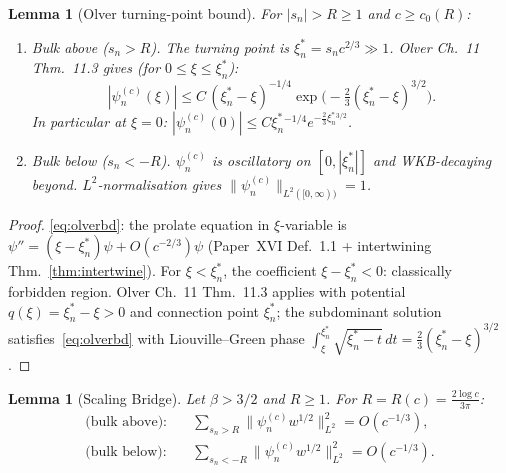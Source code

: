 \documentclass[12pt,a4paper]{amsart}
\newtheorem{lemma}[theorem]{Lemma}
\theoremstyle{definition}
\newcommand{\xin}{\xi_n^*}
\begin{document}
\begin{lemma}[Olver turning-point bound]
\label{lem:efbound}
For $|s_n|>R\geq 1$ and $c\geq c_0(R)$:
\begin{enumerate}[nosep,label=(\roman*)]
  \item \emph{Bulk above} ($s_n>R$).
    The turning point is $\xin = s_n c^{2/3}\gg 1$.
    Olver \cite{Olver1997} Ch.~11 Thm.~11.3 gives
    (for $0\leq\xi\leq\xin$):
    \begin{equation}\label{eq:olverbd}
      |\psi_n^{(c)}(\xi)|
      \leq C\,(\xin-\xi)^{-1/4}
      \exp\!\bigl(-\tfrac{2}{3}(\xin-\xi)^{3/2}\bigr).
    \end{equation}
    In particular at $\xi=0$:
    $|\psi_n^{(c)}(0)|\leq C\xin^{-1/4}e^{-\frac{2}{3}\xin^{3/2}}$.
  \item \emph{Bulk below} ($s_n<-R$).
    $\psi_n^{(c)}$ is oscillatory on $[0,|\xin|]$
    and WKB-decaying beyond. $L^2$-normalisation gives
    $\|\psi_n^{(c)}\|_{L^2([0,\infty))}=1$.
\end{enumerate}
\end{lemma}

\begin{proof}
\eqref{eq:olverbd}: the prolate equation in $\xi$-variable is
$\psi'' = (\xi-\xin)\psi + O(c^{-2/3})\psi$
(Paper~XVI Def.~1.1 + intertwining Thm.~\ref{thm:intertwine}).
For $\xi<\xin$, the coefficient $\xi-\xin<0$: classically forbidden region.
Olver Ch.~11 Thm.~11.3 applies with potential
$q(\xi) = \xin-\xi>0$ and connection point $\xin$;
the subdominant solution satisfies~\eqref{eq:olverbd}
with Liouville--Green phase
$\int_\xi^{\xin}\sqrt{\xin-t}\,dt = \tfrac{2}{3}(\xin-\xi)^{3/2}$.
\end{proof}

\begin{lemma}[Scaling Bridge]
\label{lem:scalingbridge}
Let $\beta>3/2$ and $R\geq 1$.
For $R = R(c) = \frac{2\log c}{3\pi}$:
\begin{align}
  \text{(bulk above):}\quad
  &\sum_{s_n>R}\|\psi_n^{(c)}w^{1/2}\|_{L^2}^2
  = O(c^{-1/3}),
  \label{eq:bridge-above}\\
  \text{(bulk below):}\quad
  &\sum_{s_n<-R}\|\psi_n^{(c)}w^{1/2}\|_{L^2}^2
  = O(c^{-1/3}).
  \label{eq:bridge-below}
\end{align}
\end{lemma}
\end{document}
